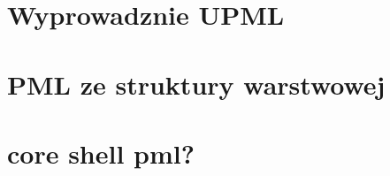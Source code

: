 
\section{Wyprowadznie UPML}

\section{PML ze struktury warstwowej~\cite{ania2015}}

\section{core shell pml?}


